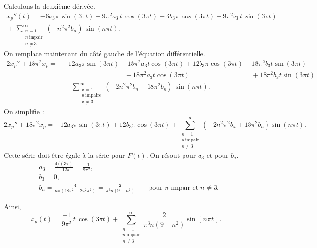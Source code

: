 \begin{example}
Calculons la deuxième dérivée.
\begin{multline*}
x_p''(t) =
- 6 a_3
\pi \, \sin (3 \pi t) - 9\pi^2 a_3 \, t \, \cos (3 \pi t)
+
6 b_3
\pi \, \cos (3 \pi t) - 9\pi^2 b_3 \, t \, \sin (3 \pi t)
\\
{} +
\sum_{\substack{n=1 \\ n~\text{impair} \\ n\not= 3}}^\infty
(-n^2 \pi^2 b_n ) \,
\sin (n \pi t) . 
\end{multline*}
On remplace maintenant du côté gauche de l'équation différentielle.
\begin{align*}
2x_p'' + 18\pi^2 x_p 
= & 
- 12 a_3 \pi \sin (3 \pi t)
- 18\pi^2 a_3 t \cos (3 \pi t)
+ 12 b_3 \pi \cos (3 \pi t)
- 18\pi^2 b_3 t \sin (3 \pi t)
\\
& \phantom{\, - 12 a_3 \pi \sin (3 \pi t)} ~
{} + 18 \pi^2 a_3 t \cos (3 \pi t)
\phantom{\, + 12 b_3 \pi \cos (3 \pi t)} ~
{} + 18 \pi^2 b_3 t \sin (3 \pi t)
\\
& {} + \sum_{\substack{n=1 \\ n~\text{impaire} \\ n\not= 3}}^\infty
(-2n^2 \pi^2 b_n + 18\pi^2 b_n) \,
\sin (n \pi t) . 
\end{align*}
On simplifie :
\begin{equation*}
2x_p'' + 18\pi^2 x_p =
- 12 a_3
\pi \sin (3 \pi t)
+
12 b_3
\pi \cos (3 \pi t)
+
\sum_{\substack{n=1 \\ n~\text{impair} \\ n\not= 3}}^\infty
(-2n^2 \pi^2 b_n + 18\pi^2 b_n)
\sin (n \pi t) . 
\end{equation*}
Cette série doit être égale à la série pour $F(t)$.
On résout pour $a_3$ et pour $b_n$.
\begin{align*}
& a_3 = \frac{4/(3\pi)}{-12\pi} = \frac{-1}{9\pi^2} , \\
& b_3 = 0 , \\
& b_n = \frac{4}{n\pi(18\pi^2 - 2n^2 \pi^2)} 
= \frac{2}{\pi^3 n(9 - n^2)} \qquad \text{pour } n \text{ impair et } n\not=3 .
\end{align*}

Ainsi,
\begin{equation*}
x_p(t) =
\frac{-1}{9\pi^2}
\,
t \, \cos (3 \pi t)
+
\sum_{\substack{n=1 \\ n~\text{impair} \\ n\not= 3}}^\infty
\frac{2}{\pi^3 n(9 - n^2)}
\sin (n \pi t) . 
\end{equation*}
\end{example}

